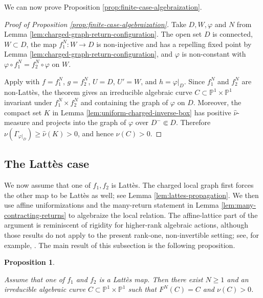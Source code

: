 \documentclass[11pt]{amsart}
\numberwithin{equation}{section}
\theoremstyle{plain}
\newtheorem{prop}[thm]{Proposition}
\theoremstyle{definition}
\theoremstyle{remark}
\begin{document}
We can now prove Proposition \ref{prop:finite-case-algebraization}.

\begin{proof}[Proof of Proposition \ref{prop:finite-case-algebraization}]
Take $D,W,\varphi$ and $N$ from Lemma \ref{lem:charged-graph-return-configuration}. The open set $D$ is connected,
$W\subset D$, the map $f_1^N\colon W\to D$ is non-injective and has
a repelling fixed point by Lemma \ref{lem:charged-graph-return-configuration}, and
$\varphi$ is non-constant with
$\varphi\circ f_1^N=f_2^N\circ\varphi$ on $W$.

Apply \cite[Theorem 2.1]{JiXieLocalRigidityJuliaSets} with
$f=f_1^N$, $g=f_2^N$, $U=D$, $U'=W$, and
$h=\varphi|_D$.
Since $f_1^N$ and $f_2^N$ are non-Latt\`es, the
theorem gives an irreducible algebraic curve
$C\subset\mathbb P^1\times\mathbb P^1$ invariant under
$f_1^N\times f_2^N$ and containing the graph of $\varphi$ on $D$.
Moreover, the compact set $K$ in Lemma
\ref{lem:uniform-charged-inverse-box} has positive $\hat\nu$-measure
and projects into the graph of $\varphi$ over $D^-\Subset D$.
Therefore
$\nu(\Gamma_{\varphi|_D})\geq\hat\nu(K)>0$, and hence
$\nu(C)>0$.
\end{proof}

\subsection{The Latt\`es case}
\label{subsec:finite-lattes}

We now assume that one of $f_1,f_2$ is Latt\`es. The charged local
graph first forces the other map to be Latt\`es as well; see Lemma
\ref{lem:lattes-propagation}. We then use affine uniformizations and
the many-return statement in Lemma \ref{lem:many-contracting-returns}
to algebraize the local relation.
The affine-lattice part of the argument is reminiscent of rigidity
for higher-rank algebraic actions, although those results do not
apply to the present rank-one, non-invertible setting; see, for
example,
\cite{KalininKatok,KalininSpatzier}.
The main result of this subsection is the following proposition.

\begin{prop}\label{prop:lattes-finite-algebraization}

Assume that one of $f_1$ and $f_2$ is a Latt\`es map. Then there exist $N\geq1$ and an
irreducible algebraic curve $C\subset\mathbb P^1\times\mathbb P^1$
such that $F^N(C)=C$ and $\nu(C)>0$.
\end{prop}
\end{document}
